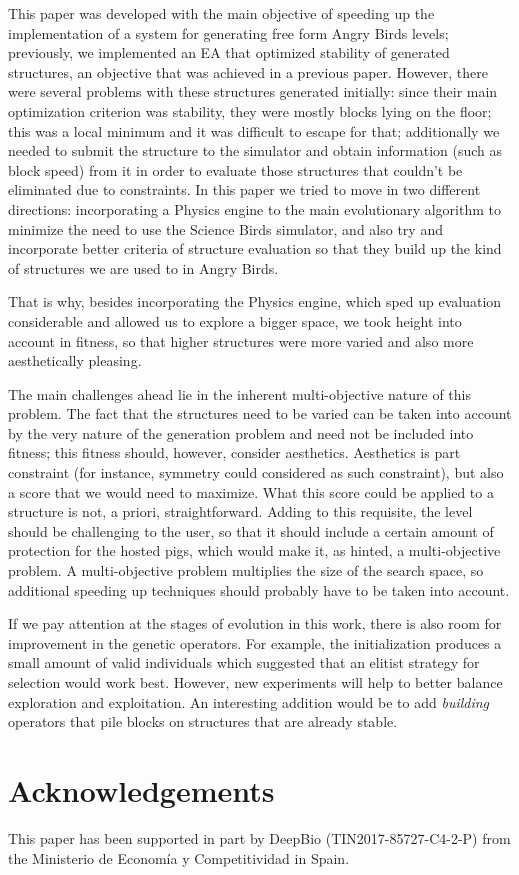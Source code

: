 \documentclass[a4paper,twoside]{article}
\begin{document}
This paper was developed with the main objective of speeding up the
implementation of a system for generating free form Angry Birds
levels; previously, we implemented an EA that optimized stability of
generated structures, an objective that was achieved in a previous
paper. However, there were several problems with these 
structures generated initially: since their main optimization criterion was stability,
they were mostly blocks lying on the floor; this was a local minimum
and it was difficult to escape for that; additionally we needed to
submit the structure to the simulator and obtain information (such as
block speed) from it in order to evaluate those structures that
couldn't be eliminated due to constraints. In this paper we tried to
move in two different directions: incorporating a Physics engine to
the main evolutionary algorithm to minimize the need to use the
Science Birds simulator, and also try and incorporate better criteria
of structure evaluation so that they build up the kind of structures
we are used to in Angry Birds.

That is why, besides incorporating the Physics engine, which sped up
evaluation considerable and allowed us to explore a bigger space, we
took height into account in fitness, so that higher structures were
more varied and also more aesthetically pleasing. 

The main challenges ahead lie in the inherent multi-objective nature
of this problem. The fact that the structures need to be varied can be
taken into account by the very nature of the generation problem and
need not be included into fitness; this fitness should, however,
consider aesthetics. Aesthetics is part constraint (for instance,
symmetry could considered as such constraint), but also a score that
we would need to maximize. What this score could be applied to a
structure is not, a priori, straightforward. Adding to this requisite,
the level should be challenging to the user, so that it should include
a certain amount of protection for the hosted pigs, which would make
it, as hinted, a multi-objective problem. A multi-objective problem
multiplies the size of the search space, so additional speeding up
techniques should probably have to be taken into account.

If we pay attention at the stages of evolution in this work, there is also 
room for improvement in the genetic operators. For example, the initialization 
produces a small amount of valid individuals which suggested that an elitist 
strategy for selection would work best. However, new experiments will help to 
better balance exploration and exploitation. An interesting addition
would be to add {\em building} operators that pile blocks on
structures that are already stable. 

\section{Acknowledgements}
 This paper has been supported in part by DeepBio
 (TIN2017-85727-C4-2-P) from the Ministerio de Economía y Competitividad
 in Spain.


{\small
}
\end{document}

